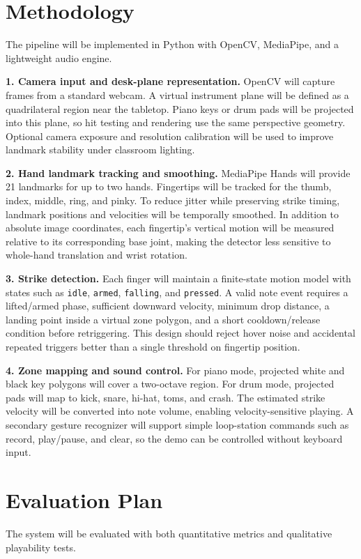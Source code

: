 \documentclass[10pt]{article}
\begin{document}
\section{Methodology}
The pipeline will be implemented in Python with OpenCV, MediaPipe, and a lightweight audio engine.

\textbf{1. Camera input and desk-plane representation.} OpenCV will capture frames from a standard webcam. A virtual instrument plane will be defined as a quadrilateral region near the tabletop. Piano keys or drum pads will be projected into this plane, so hit testing and rendering use the same perspective geometry. Optional camera exposure and resolution calibration will be used to improve landmark stability under classroom lighting.

\textbf{2. Hand landmark tracking and smoothing.} MediaPipe Hands will provide 21 landmarks for up to two hands. Fingertips will be tracked for the thumb, index, middle, ring, and pinky. To reduce jitter while preserving strike timing, landmark positions and velocities will be temporally smoothed. In addition to absolute image coordinates, each fingertip's vertical motion will be measured relative to its corresponding base joint, making the detector less sensitive to whole-hand translation and wrist rotation.

\textbf{3. Strike detection.} Each finger will maintain a finite-state motion model with states such as \texttt{idle}, \texttt{armed}, \texttt{falling}, and \texttt{pressed}. A valid note event requires a lifted/armed phase, sufficient downward velocity, minimum drop distance, a landing point inside a virtual zone polygon, and a short cooldown/release condition before retriggering. This design should reject hover noise and accidental repeated triggers better than a single threshold on fingertip position.

\textbf{4. Zone mapping and sound control.} For piano mode, projected white and black key polygons will cover a two-octave region. For drum mode, projected pads will map to kick, snare, hi-hat, toms, and crash. The estimated strike velocity will be converted into note volume, enabling velocity-sensitive playing. A secondary gesture recognizer will support simple loop-station commands such as record, play/pause, and clear, so the demo can be controlled without keyboard input.

\section{Evaluation Plan}
The system will be evaluated with both quantitative metrics and qualitative playability tests.
\end{document}

